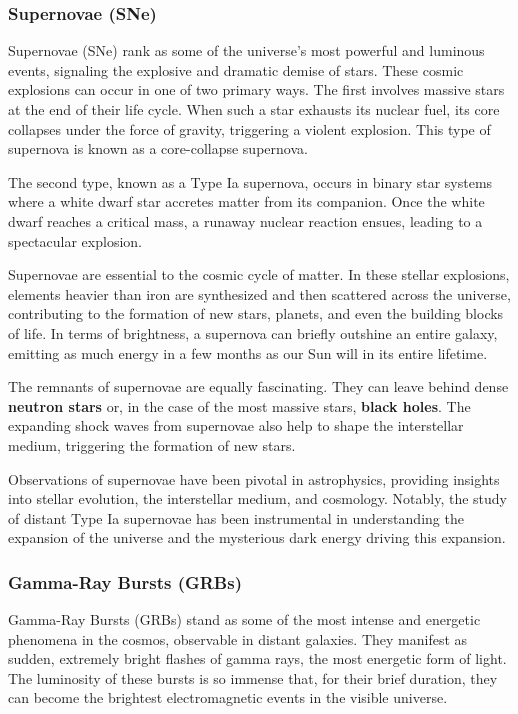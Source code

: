 \subsubsection{Supernovae (SNe)}

Supernovae (SNe) rank as some of the universe's most powerful and luminous events, signaling the explosive and dramatic demise of stars. These cosmic explosions can occur in one of two primary ways. The first involves massive stars at the end of their life cycle. When such a star exhausts its nuclear fuel, its core collapses under the force of gravity, triggering a violent explosion. This type of supernova is known as a core-collapse supernova.

The second type, known as a Type Ia supernova, occurs in binary star systems where a white dwarf star accretes matter from its companion. Once the white dwarf reaches a critical mass, a runaway nuclear reaction ensues, leading to a spectacular explosion.

Supernovae are essential to the cosmic cycle of matter. In these stellar explosions, elements heavier than iron are synthesized and then scattered across the universe, contributing to the formation of new stars, planets, and even the building blocks of life. In terms of brightness, a supernova can briefly outshine an entire galaxy, emitting as much energy in a few months as our Sun will in its entire lifetime.

The remnants of supernovae are equally fascinating. They can leave behind dense \textbf{neutron stars} or, in the case of the most massive stars, \textbf{black holes}. The expanding shock waves from supernovae also help to shape the interstellar medium, triggering the formation of new stars.

Observations of supernovae have been pivotal in astrophysics, providing insights into stellar evolution, the interstellar medium, and cosmology. Notably, the study of distant Type Ia supernovae has been instrumental in understanding the expansion of the universe and the mysterious dark energy driving this expansion.

\subsubsection{Gamma-Ray Bursts (GRBs)}

Gamma-Ray Bursts (GRBs) stand as some of the most intense and energetic phenomena in the cosmos, observable in distant galaxies. They manifest as sudden, extremely bright flashes of gamma rays, the most energetic form of light. The luminosity of these bursts is so immense that, for their brief duration, they can become the brightest electromagnetic events in the visible universe.

